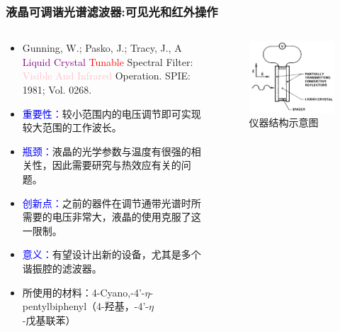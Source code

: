\begin{frame}[c]
    \frametitle{液晶可调谐光谱滤波器:可见光和红外操作}
    \begin{columns}
        \begin{column}{.6\textwidth}
            \begin{itemize}
                \item Gunning, W.;  Pasko, J.; Tracy, J., A \textcolor{purple}{Liquid Crystal} \textcolor{red}{Tunable} Spectral Filter: \textcolor{pink}{Visible And Infrared} Operation. SPIE: 1981; Vol. 0268.
                \item \textcolor{blue}{重要性：}较小范围内的电压调节即可实现较大范围的工作波长。
                \item \textcolor{blue}{瓶颈：}液晶的光学参数与温度有很强的相关性，因此需要研究与热效应有关的问题。
                \item \textcolor{blue}{创新点：}之前的器件在调节通带光谱时所需要的电压非常大，液晶的使用克服了这一限制。
                \item \textcolor{blue}{意义：}有望设计出新的设备，尤其是多个谐振腔的滤波器。
                \item \footnotesize{所使用的材料：\textrm{4-Cyano,-4'-$\eta$-pentylbiphenyl}（4-羟基，-4'-$\eta$-戊基联苯）}
            \end{itemize}
        \end{column}
        \begin{column}{.4\textwidth}
            \begin{figure}[!htb] %
                \centering %
                \includegraphics[width=1.\textwidth]{figures/A Liquid Crystal Tunable Spectral Filter Visible And Infrared Operation_1.png} %
                \caption{仪器结构示意图} %
            \end{figure}
        \end{column}
    \end{columns}
\end{frame}


